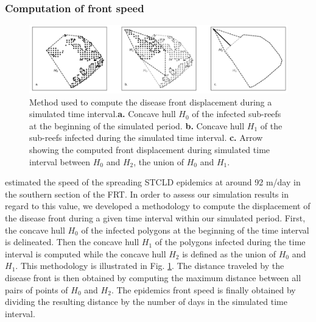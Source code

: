 \documentclass[utf8]{frontiersSCNS}
\begin{document}
\subsubsection{Computation of front speed}

\begin{figure}
    \centering
    \includegraphics[width=.99\linewidth]{figures/hull_example.png}
    \caption{Method used to compute the disease front displacement during a simulated time interval.\textbf{a.} Concave hull $H_0$ of the infected sub-reefs at the beginning of the simulated period. \textbf{b.} Concave hull $H_1$ of the sub-reefs infected during the simulated time interval. \textbf{c.} Arrow showing the computed front displacement during simulated time interval between $H_0$ and $H_2$, the union of $H_0$ and $H_1$.}
    \label{fig:hull}
\end{figure}

\cite{muller2020spatial} estimated the speed of the spreading STCLD epidemics at around 92 m/day in the southern section of the FRT. In order to assess our simulation results in regard to this value, we developed a methodology to compute the displacement of the disease front during a given time interval within our simulated period. First, the concave hull $H_0$ of the infected polygons at the beginning of the time interval is delineated. Then the concave hull $H_1$ of the polygons infected during the time interval is computed while the concave hull $H_2$ is defined as the union of $H_0$ and $H_1$. This methodology is illustrated in Fig. \ref{fig:hull}. The distance traveled by the disease front is then obtained by computing the maximum distance between all pairs of points of $H_0$ and $H_2$. The epidemics front speed is finally obtained by dividing the resulting distance by the number of days in the simulated time interval.
\end{document}
